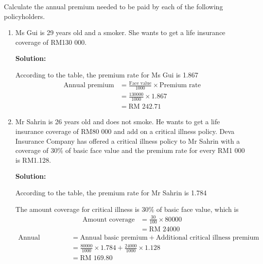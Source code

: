 \documentclass{report}
\newcommand{\sol}{

    \vspace{0.5em}\textbf{Solution:}\vspace{0.5em}}
\begin{document}
\begin{enumerate}
          Calculate the annual premium needed to be paid by each of the following
          policyholders.
          \begin{enumerate}
              \item Ms Gui is 29 years old and a smoker. She wants to get a life insurance coverage
                    of RM130 000. \sol{}

                    According to the table, the premium rate for Ms Gui is 1.867
                    \begin{align*}
                        \text{Annual premium} & = \frac{\text{Face value}}{1000} \times \text{Premium rate} \\
                                              & = \frac{130 000}{1000} \times 1.867                         \\
                                              & = \text{RM } 242.71
                    \end{align*}

              \item Mr Sahrin is 26 years old and does not smoke. He wants to get a life insurance
                    coverage of RM80 000 and add on a critical illness policy. Deva Insurance
                    Company has offered a critical illness policy to Mr Sahrin with a coverage of
                    $30 \%$ of basic face value and the premium rate for every RM1 000 is RM1.128.
                    \sol{}

                    According to the table, the premium rate for Mr Sahrin is 1.784

                    The amount coverage for critical illness is $30 \%$ of basic face value, which
                    is
                    \begin{align*}
                        \text{Amount coverage} & = \frac{30}{100} \times 80 000 \\
                                               & = \text{RM } 24 000
                    \end{align*}
                    \begin{align*}
                        \text{Annual premium} & = \text{Annual basic premium} + \text{Additional critical illness premium} \\
                                              & = \frac{80 000}{1000} \times 1.784  + \frac{24 000}{1000} \times 1.128     \\
                                              & = \text{RM } 169.80
                    \end{align*}
          \end{enumerate}


\end{enumerate}
\end{document}
